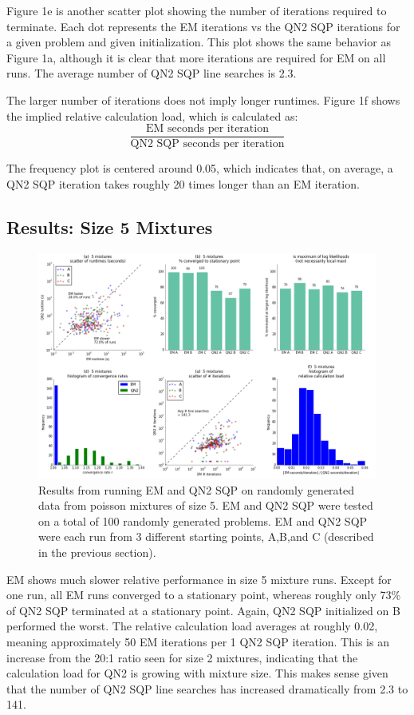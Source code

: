 \documentclass[letter,12pt]{article}
\begin{document}
Figure 1e is another scatter plot showing the number of iterations required to terminate.  Each dot represents the EM iterations vs the QN2 SQP iterations for a given problem and given initialization.  This plot shows the same behavior as Figure 1a, although it is clear that more iterations are required for EM on all runs.  The average number of QN2 SQP line searches is 2.3.

The larger number of iterations does not imply longer runtimes.  Figure 1f shows the implied relative calculation load, which is calculated as:
\[
\frac{\text{EM seconds per iteration}}{\text{QN2 SQP seconds per iteration}}
\]

The frequency plot is centered around 0.05, which indicates that, on average, a QN2 SQP iteration takes roughly 20 times longer than an EM iteration.

\pagebreak
\subsection{Results: Size 5 Mixtures}

\begin{figure}[h]
\centering
\includegraphics[width=16cm]{fig_RunData2_K5_init3.png}
\caption{Results from running EM and QN2 SQP on randomly generated data from poisson mixtures of size 5.  EM and QN2 SQP were tested on a total of 100 randomly generated problems.  EM and QN2 SQP were each run from 3 different starting points, A,B,and C (described in the previous section).}
\end{figure}

EM shows much slower relative performance in size 5 mixture runs.  Except for one run, all EM runs converged to a stationary point, whereas roughly only 73\% of QN2 SQP terminated at a stationary point.  Again, QN2 SQP initialized on B performed the worst.  The relative calculation load averages at roughly 0.02, meaning approximately 50 EM iterations per 1 QN2 SQP iteration.  This is an increase from the 20:1 ratio seen for size 2 mixtures, indicating that the calculation load for QN2 is growing with mixture size.  This makes sense given that the number of QN2 SQP line searches has increased dramatically from 2.3 to 141.
\end{document}
